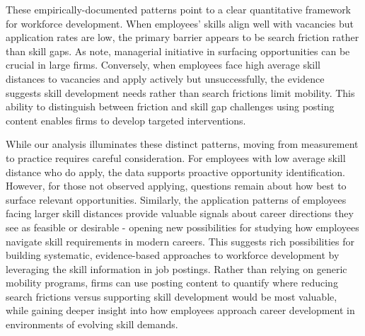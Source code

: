 These empirically-documented patterns point to a clear quantitative framework for workforce development. When employees' 
skills align well with vacancies but application rates are low, the primary barrier appears to be search friction rather 
than skill gaps. As \autocite{invisiblehand} note, managerial initiative in surfacing opportunities can be crucial in 
large firms. Conversely, when employees face high average skill distances to vacancies and apply actively but unsuccessfully, 
the evidence suggests skill development needs rather than search frictions limit mobility. This ability to distinguish 
between friction and skill gap challenges using posting content enables firms to develop targeted interventions.

While our analysis illuminates these distinct patterns, moving from measurement to practice requires careful consideration. 
For employees with low average skill distance who do apply, the data supports proactive opportunity identification. 
However, for those not observed applying, questions remain about how best to surface relevant opportunities. Similarly, 
the application patterns of employees facing larger skill distances provide valuable signals about career directions 
they see as feasible or desirable - opening new possibilities for studying how employees navigate skill requirements 
in modern careers. This suggests rich possibilities for building systematic, evidence-based approaches to workforce 
development by leveraging the skill information in job postings. Rather than relying on generic mobility programs, 
firms can use posting content to quantify where reducing search frictions versus supporting skill development would 
be most valuable, while gaining deeper insight into how employees approach career development in environments of 
evolving skill demands.


